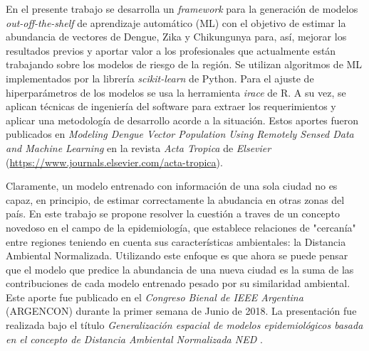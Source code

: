  \par En el presente trabajo se desarrolla un \textit{framework} para la generación
    de modelos \textit{out-off-the-shelf} de aprendizaje automático (ML) con el objetivo
    de estimar la abundancia de
    vectores de Dengue, Zika y Chikungunya para, así, mejorar los resultados
    previos y aportar valor a los profesionales que actualmente están trabajando
    sobre los modelos de riesgo de la región.
    Se utilizan algoritmos de ML implementados por la librería \textit{scikit-learn} de Python.
    Para el ajuste de hiperparámetros de los modelos se usa la herramienta
    \textit{irace} de R. A su vez, se aplican técnicas de ingeniería del software para
    extraer los requerimientos y aplicar una metodología de desarrollo acorde a la
    situación. Estos aportes fueron publicados en
    \textit{Modeling Dengue Vector Population Using Remotely Sensed Data and
    Machine Learning} \cite{scavuzzo2018modeling} en la revista \textit{Acta Tropica}
    de \textit{Elsevier} (\url{https://www.journals.elsevier.com/acta-tropica}).

  \par Claramente, un modelo entrenado con información de una sola ciudad no es capaz,
    en principio, de estimar correctamente la abudancia en otras zonas del país.
 En este trabajo
    se propone resolver la cuestión a traves de un concepto novedoso en el campo de la epidemiología, que establece
    relaciones de "cercanía" entre regiones teniendo en cuenta sus características
    ambientales: la Distancia Ambiental Normalizada. Utilizando este enfoque es que
    ahora se puede pensar que el modelo que predice la abundancia de una nueva ciudad es
    la suma de las contribuciones de cada modelo entrenado pesado por su similaridad ambiental.
    Este aporte fue publicado en el
    \textit{Congreso Bienal de IEEE Argentina} (ARGENCON) durante la primer semana de Junio
    de 2018. La presentación fue realizada bajo el título
    \textit{Generalización espacial de modelos epidemiológicos basada en el
    concepto de Distancia Ambiental Normalizada NED} \cite{ned_scavuzzo}.
